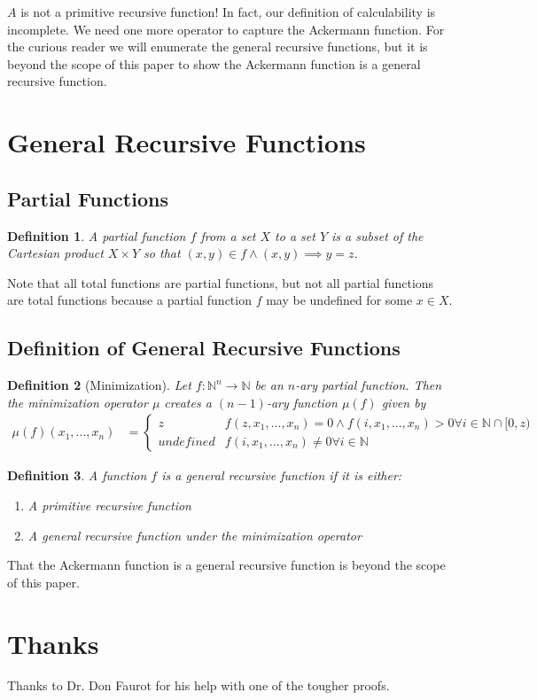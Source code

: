 \documentclass[12pt, letterpaper]{article}
\newtheorem*{definition}{Definition}
\theoremstyle{case}
\begin{document}
    $A$ is not a primitive recursive function! In fact, our definition of calculability is incomplete. We need one
    more operator to capture the Ackermann function. For the curious reader we will enumerate the general recursive functions,
    but it is beyond the scope of this paper to show the Ackermann function is a general recursive function.

  \section{General Recursive Functions}
    \subsection{Partial Functions}
      \begin{definition}
        A partial function $f$ from a set $X$ to a set $Y$ is a subset of the Cartesian product $X \times Y$ so that
        $(x, y) \in f \wedge (x, y) \implies y = z$.
      \end{definition}
      Note that all total functions are partial functions, but not all partial functions are total functions because
      a partial function $f$ may be undefined for some $x \in X$.
    \subsection{Definition of General Recursive Functions}
    \begin{definition}[Minimization]
      Let $f: \mathbb{N}^n \rightarrow \mathbb{N}$ be an $n$-ary partial function. Then the minimization operator $\mu$
      creates a $(n - 1)$-ary function $\mu(f)$ given by
      \begin{equation*}
        \begin{aligned}
          \mu(f)(x_1, ..., x_n) &=
          \begin{cases}
            z                       & f(z, x_1, ..., x_n) = 0 \wedge f(i, x_1, ..., x_n) > 0 \forall i \in \mathbb{N} \cap [0, z) \\
            undefined               & f(i, x_1, ..., x_n) \neq 0 \forall i \in \mathbb{N}
          \end{cases}
        \end{aligned}
      \end{equation*}
    \end{definition}
    \begin{definition}
      A function $f$ is a general recursive function if it is either:
      \begin{enumerate}
        \item A primitive recursive function
        \item A general recursive function under the minimization operator
      \end{enumerate}
    \end{definition}
  That the Ackermann function is a general recursive function is beyond the scope of this paper.
  
  \section{Thanks}
    Thanks to Dr. Don Faurot for his help with one of the tougher proofs.
\end{document}
